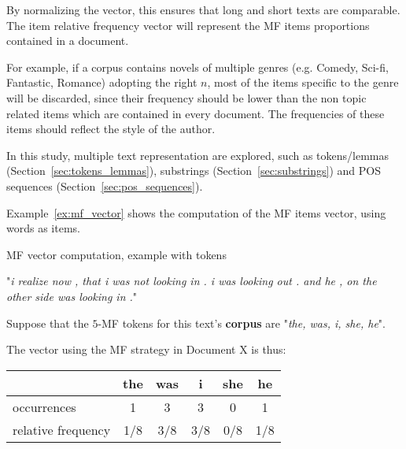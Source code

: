 By normalizing the vector, this ensures that long and short texts are comparable.
The item relative frequency vector will represent the MF items proportions contained in a document.

For example, if a corpus contains novels of multiple genres (e.g. Comedy, Sci-fi, Fantastic, Romance) adopting the right $n$, most of the items specific to the genre will be discarded, since their frequency should be lower than the non topic related items which are contained in every document.
The frequencies of these items should reflect the style of the author.

In this study, multiple text representation are explored, such as tokens/lemmas (Section~\ref{sec:tokens_lemmas}), substrings (Section~\ref{sec:substrings}) and POS sequences (Section~\ref{sec:pos_sequences}).

Example~\ref{ex:mf_vector} shows the computation of the MF items vector, using words as items.

\begin{example}
  \centering
  \caption{MF vector computation, example with tokens}
  \label{ex:mf_vector}

  \begin{subexample}{\linewidth}
    "\textit{i realize now , that i was not looking in . i was looking out . and he , on the other side was looking in .}"\cite{ddlc}
  \end{subexample}

  \vspace{0.5cm}

  \begin{subexample}{\linewidth}
    Suppose that the $5$-MF tokens for this text's \textbf{corpus} are "\textit{the, was, i, she, he}".

    The vector using the MF strategy in Document X is thus:
    \vspace{0.2cm}

    \centering
    \begin{tabular}{l c c c c c}
      \toprule
                         & the & was & i   & she & he  \\
      \midrule
      occurrences        & 1   & 3   & 3   & 0   & 1   \\
      relative frequency & 1/8 & 3/8 & 3/8 & 0/8 & 1/8 \\
      \bottomrule
    \end{tabular}
  \end{subexample}
\end{example}

